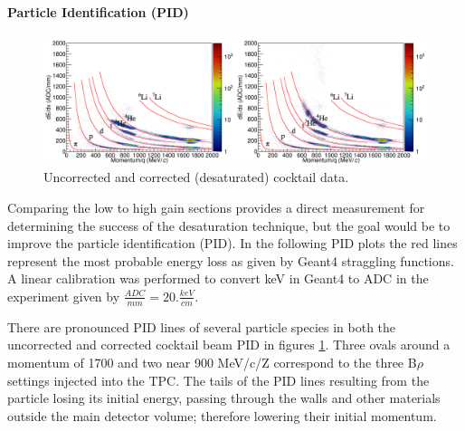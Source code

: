 \documentclass[review]{elsarticle}
\begin{document}
\paragraph{Particle Identification (PID)}

\begin{figure}[H]
\includegraphics[width=\linewidth]{cocktail_combine.png}
\caption{Uncorrected and corrected (desaturated) cocktail data.}
\label{fig:cocktail_combine}
\end{figure}

Comparing the low to high gain sections provides a direct measurement for determining the success of the desaturation technique, but the goal would be to improve the particle identification (PID). In the following PID plots the red lines represent the most probable energy loss as given by Geant4 straggling functions. A linear calibration was performed to convert keV in Geant4 to ADC in the experiment given by $\frac{ADC}{mm} = 20. \frac{keV}{cm}$.


There are pronounced PID lines of several particle species in both the uncorrected and corrected cocktail beam PID in figures \ref{fig:cocktail_combine}. Three ovals around a momentum of 1700 and two near 900 MeV/c/Z correspond to the three B$\rho$ settings injected into the TPC. The tails of the PID lines resulting from the particle losing its initial energy, passing through the walls and other materials outside the main detector volume; therefore lowering their initial momentum. 
\end{document}
